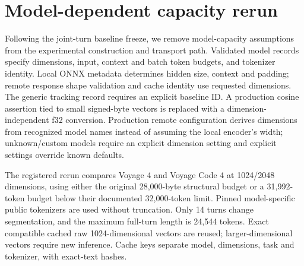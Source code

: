 \section{Model-dependent capacity rerun}
Following the joint-turn baseline freeze, we remove model-capacity assumptions
from the experimental construction and transport path. Validated model records
specify dimensions, input, context and batch token budgets, and tokenizer identity.
Local ONNX metadata determines hidden size, context and padding; remote response
shape validation and cache identity use requested dimensions. The generic tracking
record requires an explicit baseline ID. A production cosine assertion tied to
small signed-byte vectors is replaced with a dimension-independent f32 conversion.
Production remote configuration derives dimensions from recognized model names
instead of assuming the local encoder's width; unknown/custom models require an
explicit dimension setting and explicit settings override known defaults.

The registered rerun compares Voyage 4 and Voyage Code 4 at 1024/2048 dimensions,
using either the original 28,000-byte structural budget or a 31,992-token budget
below their documented 32,000-token limit. Pinned model-specific public tokenizers
are used without truncation. Only 14 turns change segmentation, and the maximum
full-turn length is 24,544 tokens. Exact compatible cached raw 1024-dimensional
vectors are reused; larger-dimensional vectors require new inference. Cache keys
separate model, dimensions, task and tokenizer, with exact-text hashes.


